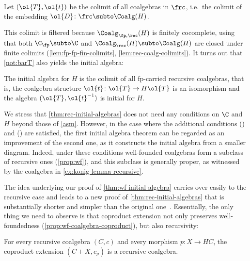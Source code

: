 \begin{construction}\label{not:barT}
Let $(\ol{T},\ol{t})$ be the colimit of all coalgebras in $\frc$, i.e.\ the colimit of the embedding $\ol{D}\colon \frc\subto \Coalg(H)$. 
\end{construction}
This colimit is filtered because $\Coalg_{\fp,\rec}(H)$ is finitely cocomplete, using that both $\C_\fp\subto \C$ and $\Coalg_\rec(H)\subto \Coalg(H)$ are closed under finite colimits (\autoref{lem:fp-fp-fin-colimits}, \autoref{lem:rec-coalg-colimits}). It turns out that \autoref{not:barT} also yields the initial algebra:

\begin{theorem}\label{thm:rec-initial-algebras}
The initial algebra for $H$ is the colimit of all fp-carried recursive coalgebras, that is, the coalgebra structure $\ol{t}\colon \ol{T}\to H\ol{T}$ is an isomorphism and the algebra $(\ol{T},\ol{t}^{-1})$ is initial for $H$.
\end{theorem}
We stress that \autoref{thm:rec-initial-algebras} does not need any conditions on $\C$ and $H$ beyond those of \autoref{asm}. However, in the case where the additional conditions (\injmono) and (\hpresint) are satisfied, the first initial algebra theorem can be regarded as an improvement of the second one, as it constructs the initial algebra from a smaller diagram. Indeed, under these conditions well-founded coalgebras form a subclass of recursive ones (\autoref{prop:wf}), and this subclass is generally proper, as witnessed by the coalgebra in \autoref{ex:konig-lemma-recursive}.

The idea underlying our proof of \autoref{thm:wf-initial-algebra} carries over easily to the recursive case and leads to a new proof of \autoref{thm:rec-initial-algebras} that is substantially shorter and simpler than the original one~\cite{wm24}. Essentially, the only thing we need to observe is that coproduct extension not only preserves well-foundedness (\autoref{prop:wf-coalgebra-coproduct}), but also recursivity:

\begin{proposition}\label{prop:rec-coalgebra-coproduct}
For every recursive coalgebra $(C,c)$ and every morphism $p\colon X\to HC$, the coproduct extension $(C+X,c_p)$ is a recursive coalgebra.
\end{proposition}

